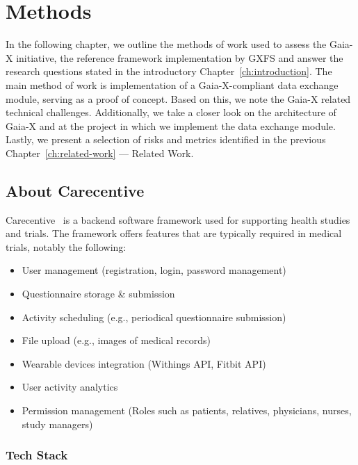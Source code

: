 \chapter{Methods}\label{ch:methods}

\begin{chapterabstract}
    In the following chapter, we outline the methods of work used to assess the Gaia-X initiative, the reference framework implementation by GXFS and answer the research questions stated in the introductory Chapter~\ref{ch:introduction}.
    The main method of work is implementation of a Gaia-X-compliant data exchange module, serving as a proof of concept.
    Based on this, we note the Gaia-X related technical challenges.
    Additionally, we take a closer look on the architecture of Gaia-X and at the project in which we implement the data exchange module.
    Lastly, we present a selection of risks and metrics identified in the previous Chapter~\ref{ch:related-work} --- Related Work.
\end{chapterabstract}

\section{About Carecentive}\label{sec:about-carecentive}

Carecentive~\cite{carecentive} is a backend software framework used for supporting health studies and trials.
The framework offers features that are typically required in medical trials, notably the following:
\begin{itemize}
    \item User management (registration, login, password management)
    \item Questionnaire storage \& submission
    \item Activity scheduling (e.g., periodical questionnaire submission)
    \item File upload (e.g., images of medical records)
    \item Wearable devices integration (Withings API, Fitbit API)
    \item User activity analytics
    \item Permission management (Roles such as patients, relatives, physicians, nurses, study managers)
\end{itemize}

\subsection{Tech Stack}\label{subsec:tech-stack}

